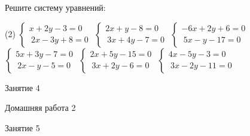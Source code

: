\begin{class}[number=3]
	\begin{listofex}
		\item Решите систему уравнений:
		\begin{tasks}(2)
			\task \( \begin{cases}
				x+2y-3=0 \\\
				2x-3y+8=0
			\end{cases} \)
			\task \( \begin{cases}
				2x+y-8=0 \\\
				3x+4y-7=0 
			\end{cases} \)
			\task \( \begin{cases}
				-6x+2y+6=0 \\\
				5x-y-17=0 
			\end{cases} \)
			\task \( \begin{cases}
				5x+3y-7=0 \\\
				2x-y-5=0 
			\end{cases} \)
			\task \( \begin{cases}
				2x+5y-15=0 \\\
				3x+2y-6=0 
			\end{cases} \)
			\task \( \begin{cases}
				4x-5y-3=0 \\\
				3x-2y-11=0 
			\end{cases} \)
		\end{tasks}
		
		
	\end{listofex}
\end{class}

\begin{class}[number=4]
	\begin{listofex}
		\item Занятие 4
	\end{listofex}
\end{class}

\begin{homework}[number=2]
	\begin{listofex}
		\item Домашняя работа 2
	\end{listofex}
\end{homework}

\begin{class}[number=5]
	\begin{listofex}
		\item Занятие 5
	\end{listofex}
\end{class}

